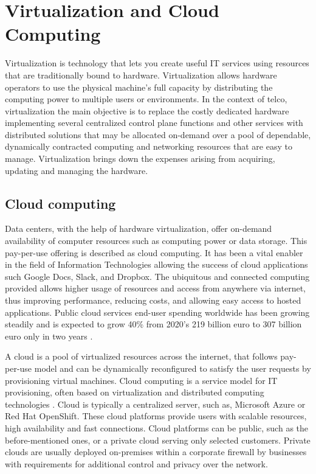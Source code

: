 \chapter{Virtualization and Cloud Computing}
\label{chapter:cloudcomputing}


Virtualization is technology that lets you create useful IT services using resources that are traditionally bound to hardware. Virtualization allows hardware operators to use the physical machine's full capacity by distributing the computing power to multiple users or environments. \cite{RedHat} In the context of telco, virtualization the main objective is to replace the costly dedicated hardware implementing several centralized control plane functions and other services with distributed solutions that may be allocated on-demand over a pool of dependable, dynamically contracted computing and networking resources that are easy to manage. \cite{Bosch2011} Virtualization brings down the expenses arising from acquiring, updating and managing the hardware. 

\section{Cloud computing}

Data centers, with the help of hardware virtualization, offer on-demand availability of computer resources such as computing power or data storage. This pay-per-use offering is described as cloud computing. It has been a vital enabler in the field of Information Technologies allowing the success of cloud applications such Google Docs, Slack, and Dropbox. The ubiquitous and connected computing provided allows higher usage of resources and access from anywhere via internet, thus improving performance, reducing costs, and allowing easy access to hosted applications. Public cloud services end-user spending worldwide has been growing steadily and is expected to grow 40\% from 2020's 219 billion euro to 307 billion euro only in two years \cite{PublicCloudStatista}.

A cloud is a pool of virtualized resources across the internet, that follows pay-per-use model and can be dynamically reconfigured to satisfy the user requests by provisioning virtual machines. Cloud computing is a service model for IT provisioning, often based on virtualization and distributed computing technologies \cite{Lombardi2011}. Cloud is typically a centralized server, such as, Microsoft Azure or Red Hat OpenShift. These cloud platforms provide users with scalable resources, high availability and fast connections. Cloud platforms can be public, such as the before-mentioned ones, or a private cloud serving only selected customers. Private clouds are usually deployed on-premises within a corporate firewall by businesses with requirements for additional control and privacy over the network. \cite{MicrosoftAzure}

